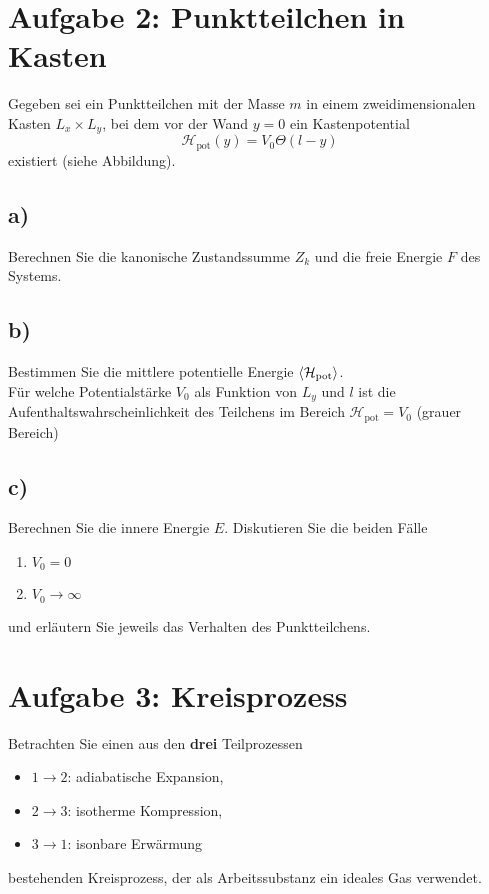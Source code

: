 \section{Aufgabe 2: Punktteilchen in Kasten}
Gegeben sei ein Punktteilchen mit der Masse $m$ in einem zweidimensionalen Kasten $L_x \times L_y$, 
bei dem vor der Wand $y=0$ ein Kastenpotential 
\[
\mathcal{H}_\text{pot}(y) = V_0\Theta(l-y)    
\]
existiert (siehe Abbildung).

\subsection{a)}
Berechnen Sie die kanonische Zustandssumme $Z_k$ und die freie Energie $F$ des Systems.

\subsection{b)}
Bestimmen Sie die mittlere potentielle Energie $\left\langle\mathcal{H_\text{pot}}\right\rangle$.
\\
Für welche Potentialstärke $V_0$ als Funktion von $L_y$ und $l$ ist die Aufenthaltswahrscheinlichkeit des Teilchens im Bereich $\mathcal{H}_\text{pot} = V_0$ (grauer Bereich)

\subsection{c)}
Berechnen Sie die innere Energie $E$.
Diskutieren Sie die beiden Fälle
\begin{enumerate}
    \item $V_0 = 0$
    \item $V_0 \to \infty$
\end{enumerate}
und erläutern Sie jeweils das Verhalten des Punktteilchens.


\section{Aufgabe 3: Kreisprozess}
Betrachten Sie einen aus den \textbf{drei} Teilprozessen
\begin{itemize}
    \item $1 \to 2$: adiabatische Expansion,
    \item $2 \to 3$: isotherme Kompression,
    \item $3 \to 1$: isonbare Erwärmung
\end{itemize}
bestehenden Kreisprozess, der als Arbeitssubstanz ein ideales Gas verwendet.

